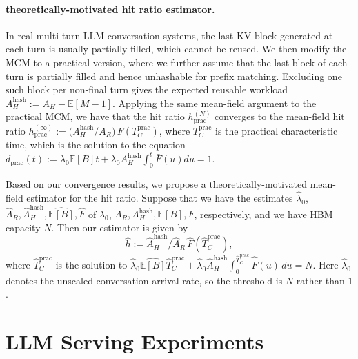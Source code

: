 \documentclass{article}
\theoremstyle{definition}
\newcommand{\E}{\mathbb E}
\newcommand{\chutong}[1]{[\textcolor{red}{Chutong: #1}]}
\begin{document}
\paragraph{theoretically-motivated hit ratio estimator.}
In real multi-turn LLM conversation systems, the last KV block generated at each turn is usually partially filled, which cannot be reused. We then modify the MCM to a practical version, where we further assume that the last block of each turn is partially filled and hence unhashable for prefix matching. Excluding one such block per non-final turn gives the expected reusable workload $A_H^{\mathrm{hash}}:=A_H-\E[M-1].$ Applying the same mean-field argument to the practical MCM, we have that the hit ratio $h_{ \mathrm{prac}}^{(N)}$ converges to the mean-field hit ratio $h_{ \mathrm{prac}}^{(\infty)}:={(A_H^{\mathrm{hash}}}/{A_R})\,F(T_C^{\mathrm{prac}})$, where $T_C^{\mathrm{prac}}$ is the practical characteristic time, which is the  solution to the  equation $d_{\mathrm{prac}}(t):=\lambda_0 \E[B]t+\lambda_0 A_H^{\mathrm{hash}}\int_0^t \bar F(u) du =1.$

Based on our convergence results, we propose a theoretically-motivated mean-field estimator for the hit ratio. Suppose that we have the estimates $\hat \lambda_0$, $\hat A_R, \widehat A_H^{\mathrm{hash}}, \widehat{\E[B]}, \widehat F$ of $\lambda_0$, $A_R, A_H^{\mathrm{hash}}, {\E[B]}, F$, respectively, and we have HBM capacity $N$. Then our estimator is given by 
\begin{equation} \label{eq:estimator}
    \widehat h:={\widehat A_H^{\mathrm{hash}}}/{\widehat A_R} \, \widehat F(\widehat T_C^{\mathrm{prac}}),
\end{equation}
where $\widehat T_C^{\mathrm{prac}}$ is the solution to $\hat \lambda_0 \widehat{\E[B]}\widehat T_C^{\mathrm{prac}}+\hat \lambda_0 \widehat A_H^{\mathrm{hash}}\int_0^{\widehat T_C^{\mathrm{prac}}}\widehat{\bar F}(u)\,du=N.$ Here $\hat \lambda_0$ denotes the unscaled conversation arrival rate, so the threshold
is $N$ rather than $1$.


\vspace{-0.5em}
\vspace{-0.5em}

\section{LLM Serving Experiments}
\label{sec: LLM Serving Experiments}
\vspace{-0.5em}
\vspace{-0.2em}
\end{document}
